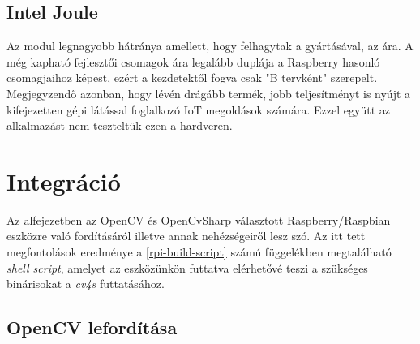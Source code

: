 \subsection{Intel Joule}

Az modul legnagyobb hátránya amellett, hogy felhagytak a gyártásával, az ára. A még kapható fejlesztői csomagok ára legalább duplája a Raspberry hasonló csomagjaihoz képest, ezért a kezdetektől fogva csak "B tervként" szerepelt. Megjegyzendő azonban, hogy lévén drágább termék, jobb teljesítményt is nyújt a kifejezetten gépi látással foglalkozó IoT megoldások számára. Ezzel együtt az alkalmazást nem teszteltük ezen a hardveren.

\section{Integráció}

Az alfejezetben az OpenCV és OpenCvSharp választott Raspberry/Raspbian eszközre való fordításáról illetve annak nehézségeiről lesz szó. Az itt tett megfontolások eredménye a \ref{rpi-build-script} számú függelékben megtalálható \emph{shell script}, amelyet az eszközünkön futtatva elérhetővé teszi a szükséges binárisokat a \emph{cv4s} futtatásához.

\subsection{OpenCV lefordítása}

